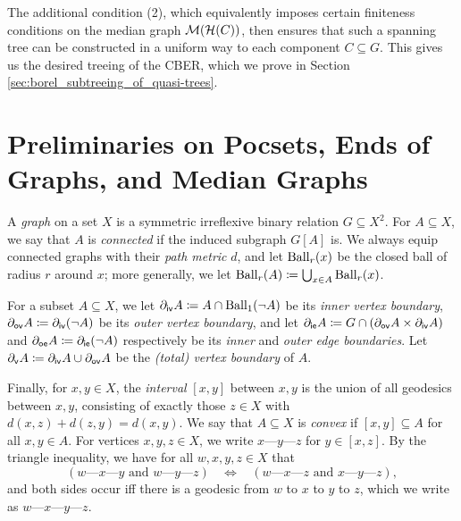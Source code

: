 \documentclass[reqno]{amsart}
\begin{document}
    The additional condition (2), which equivalently imposes certain finiteness conditions on the median graph $\mathcal{M}(\mathcal{H}(C))$, then ensures that such a spanning tree can be constructed in a uniform way to each component $C\subseteq G$. This gives us the desired treeing of the CBER, which we prove in Section \ref{sec:borel_subtreeing_of_quasi-trees}.

    \section{Preliminaries on Pocsets, Ends of Graphs, and Median Graphs}\label{sec:preliminaries}
    \renewcommand{\-}{\textrm{---}}

    \begin{notation*}
        A \textit{graph} on a set $X$ is a symmetric irreflexive binary relation $G\subseteq X^2$. For $A\subseteq X$, we say that $A$ is \textit{connected} if the induced subgraph $G[A]$ is. We always equip connected graphs with their \textit{path metric} $d$, and let $\operatorname{Ball}_r(x)$ be the closed ball of radius $r$ around $x$; more generally, we let $\operatorname{Ball}_r(A)\coloneqq\bigcup_{x\in A}\operatorname{Ball}_r(x)$.

        For a subset $A\subseteq X$, we let $\partial_\mathsf{iv}A\coloneqq A\cap\operatorname{Ball}_1(\lnot A)$ be its \textit{inner vertex boundary}, $\partial_\mathsf{ov}A\coloneqq\partial_\mathsf{iv}(\lnot A)$ be its \textit{outer vertex boundary}, and let $\partial_\mathsf{ie}A\coloneqq G\cap(\partial_\mathsf{ov}A\times\partial_\mathsf{iv}A)$ and $\partial_\mathsf{oe}A\coloneqq\partial_\mathsf{ie}(\lnot A)$ respectively be its \textit{inner} and \textit{outer edge boundaries}. Let $\partial_\mathsf{v}A\coloneqq\partial_\mathsf{iv}A\cup\partial_\mathsf{ov}A$ be the \textit{(total) vertex boundary} of $A$.

        Finally, for $x,y\in X$, the \textit{interval} $[x,y]$ between $x,y$ is the union of all geodesics between $x,y$, consisting of exactly those $z\in X$ with $d(x,z)+d(z,y)=d(x,y)$. We say that $A\subseteq X$ is \textit{convex} if $[x,y]\subseteq A$ for all $x,y\in A$. For vertices $x,y,z\in X$, we write $x\-y\-z$ for $y\in[x,z]$. By the triangle inequality, we have for all $w,x,y,z\in X$ that
        \begin{equation*}
            (w\-x\-y\textrm{ and }w\-y\-z)\ \ \ \ \Leftrightarrow\ \ \ \ (w\-x\-z\textrm{ and }x\-y\-z),
        \end{equation*}
        and both sides occur iff there is a geodesic from $w$ to $x$ to $y$ to $z$, which we write as $w\-x\-y\-z$.
    \end{notation*}
\end{document}
